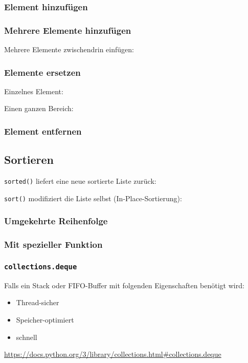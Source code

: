 \subsubsection{Element hinzufügen}


\subsubsection{Mehrere Elemente hinzufügen}

Mehrere Elemente zwischendrin einfügen:


\subsubsection{Elemente ersetzen}

Einzelnes Element:

Einen ganzen Bereich:


\subsubsection{Element entfernen}


\subsection{Sortieren}
\texttt{sorted()} liefert eine neue sortierte Liste zurück:

\texttt{sort()} modifiziert die Liste selbst (In-Place-Sortierung):


\subsubsection{Umgekehrte Reihenfolge}


\subsubsection{Mit spezieller Funktion}


\subsubsection{\texttt{collections.deque}}
Falls ein Stack oder FIFO-Buffer mit folgenden Eigenschaften benötigt wird:
\begin{itemize}
	\item Thread-sicher
	\item Speicher-optimiert
	\item schnell
\end{itemize}
\url{https://docs.python.org/3/library/collections.html#collections.deque}



